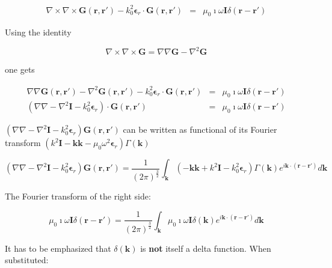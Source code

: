 \documentclass[a4paper,11pt]{thesis}
\begin{document}
\begin{eqnarray}
 \nabla \times \nabla \times  \mathbf{G}(\mathbf{r},\mathbf{r'}) -   k_0^2 \mathbf{\epsilon}_r\cdot  \mathbf{G}(\mathbf{r},\mathbf{r'})  &=& \mu_0 \imath \omega \mathbf{I}  \delta (\mathbf{r}-\mathbf{r'})
\end{eqnarray}

Using the identity

\begin{equation}
    \nabla \times \nabla \times \mathbf{G} = \nabla \nabla \mathbf{G}- \nabla^2 \mathbf{G}
\end{equation}

one gets

\begin{eqnarray}
  \nabla \nabla \mathbf{G}(\mathbf{r},\mathbf{r'})- \nabla^2 \mathbf{G}(\mathbf{r},\mathbf{r'}) -   k_0^2 \mathbf{\epsilon}_r \cdot  \mathbf{G}(\mathbf{r},\mathbf{r'})  &=& \mu_0 \imath \omega \mathbf{I}  \delta (\mathbf{r}-\mathbf{r'})\\
 \left( \nabla \nabla - \nabla^2 \mathbf{I} -   k_0^2 \mathbf{\epsilon}_r \right) \cdot  \mathbf{G}(\mathbf{r},\mathbf{r'})  &=& \mu_0 \imath \omega \mathbf{I}  \delta (\mathbf{r}-\mathbf{r'})
\end{eqnarray}

$\left( \nabla \nabla - \nabla^2 \mathbf{I} -   k_0^2 \mathbf{\epsilon}_r\right)\mathbf{G}(\mathbf{r},\mathbf{r'})$ can be written as functional of its Fourier transform $\left( k^2 \mathbf{I} -\mathbf{kk}  -   \mu_0 \omega^2 \mathbf{\epsilon}_r\right)\Gamma(\mathbf{k})$

\begin{equation}
    \left( \nabla \nabla - \nabla^2 \mathbf{I} -   k_0^2 \mathbf{\epsilon}_r\right)\mathbf{G}(\mathbf{r},\mathbf{r'})=\frac{1}{(2\pi )^{\frac{3}{2}}} \int_{\mathbf{k}} \left( -\mathbf{kk} + k^2 \mathbf{I} -   k_0^2 \mathbf{\epsilon}_r\right) \Gamma(\mathbf{k}) e^{i\mathbf{k}\cdot (\mathbf{r}-\mathbf{r'})} d\mathbf{k}
\end{equation}

The Fourier transform of the right side:

\begin{equation}
    \mu_0 \imath \omega \mathbf{I}  \delta (\mathbf{r}-\mathbf{r'})=\frac{1}{(2\pi )^{\frac{3}{2}}} \int_{\mathbf{k}} \mu_0 \imath \omega \mathbf{I}  \delta (\mathbf{k}) e^{i\mathbf{k}\cdot (\mathbf{r}-\mathbf{r'})} d\mathbf{k}
\end{equation}

It has to be emphasized that $\delta (\mathbf{k})$ is \textbf{not} itself a delta function. When substituted:
\end{document}
